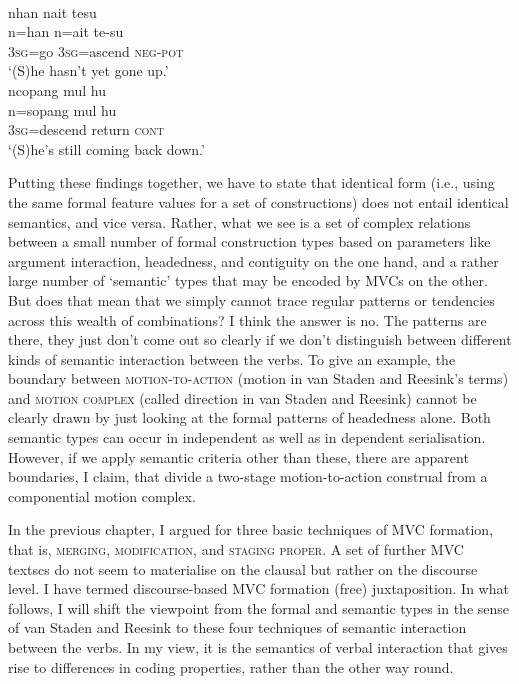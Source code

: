 \ea \label{Tabap300}
\\
\ea
\glll nhan nait tesu \\
n=han n=ait te-su \\
\textsc{3}\textsc{sg}=go \textsc{3}\textsc{sg}=ascend \textsc{neg}-\textsc{pot} \\
\glft `(S)he hasn't yet gone up.' \\ 
\ex
\glll ncopang mul hu \\ 
n=sopang mul hu \\
\textsc{3}\textsc{sg}=descend return \textsc{cont} \\
\glft `(S)he's still coming back down.'\\ 
\z
\z

Putting these findings together, we have to state that identical form (i.e., using the same formal feature values for a set of constructions) does not entail identical semantics, and vice versa. Rather, what we see is a set of complex relations between a small number of formal construction types based on parameters like argument interaction, headedness, and contiguity on the one hand, and a rather large number of `semantic' types that may be encoded by MVCs on the other. But does that mean that we simply cannot trace regular patterns or tendencies across this wealth of combinations? I think the answer is no. The patterns are there, they just don't come out so clearly if we don't distinguish between different kinds of semantic interaction between the verbs. To give an example, the boundary between \textsc{motion-to-action} (motion in van Staden and Reesink's terms) and \textsc{motion complex} (called direction in van Staden and Reesink) cannot be clearly drawn by just looking at the formal patterns of headedness alone. Both semantic types can occur in independent as well as in dependent serialisation. However, if we apply semantic criteria other than these, there are apparent boundaries, I claim, that divide a two-stage motion-to-action construal from a componential motion complex. 

In the previous chapter, I argued for three basic techniques of MVC formation, that is, \textsc{merging}, \textsc{modification}, and \textsc{staging proper}. A set of further MVC\\textscs do not seem to materialise on the clausal but rather on the discourse level. I have termed discourse-based MVC formation (free) juxtaposition. In what follows, I will shift the viewpoint from the formal and semantic types in the sense of van Staden and Reesink to these four techniques of semantic interaction between the verbs. In my view, it is the semantics of verbal interaction that gives rise to differences in coding properties, rather than the other way round. 

